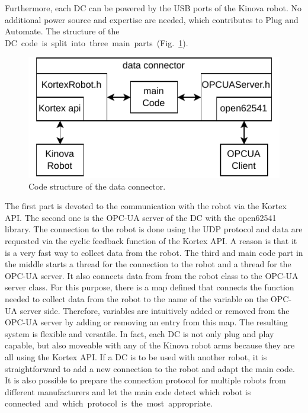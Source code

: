 \documentclass[conference]{IEEEtran}
\begin{document}
Furthermore, each DC can  be powered by the USB ports of the Kinova robot. No additional power source and expertise are needed, which contributes to Plug and Automate. The structure of the \mbox{DC code is split into three main parts (Fig. \ref{fig:dataConectorStructure}).}

\begin{figure}[b]
    \centerline{\includegraphics{Pictures/dataConectorStructure.pdf}}
    \caption{Code structure of the data connector.}
    \label{fig:dataConectorStructure}
\end{figure}
The first part is devoted to the communication with the robot via the Kortex API. The second one is the OPC-UA server of the DC with the open62541 library.
The connection to the robot is done using the UDP protocol and  data are requested via the cyclic feedback function of the Kortex API. A reason is that it is a very fast way to collect  data from the robot.
The third and main code part in the middle  starts a thread for the connection to the robot and a thread for the OPC-UA server. It also connects  data from from the robot class to the OPC-UA server class. For this purpose, there is a map defined that connects the function needed to collect  data from the robot to the name of the variable on the OPC-UA server side.
Therefore, variables are intuitively added or removed  from the OPC-UA server by adding or removing an entry from this map. The resulting  system is flexible and versatile. In fact, each DC is not only plug and play capable, but also moveable with any of the Kinova robot arms because they are all using the Kortex API. 
If a DC is to be used with another robot, it is straightforward to add a new connection to the robot and adapt the main code.
It is also possible to prepare the connection protocol for multiple robots from different manufacturers and let the main code detect which robot is \mbox{connected and which protocol is the most appropriate.}
\end{document}
